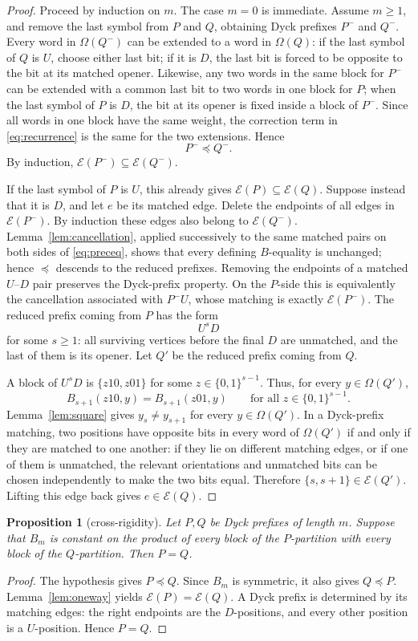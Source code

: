 \documentclass[11pt]{article}
\newtheorem{proposition}[theorem]{Proposition}
\theoremstyle{definition}
\newcommand{\E}{\mathcal E}
\newcommand{\Om}{\Omega}
\newcommand{\bits}{\{0,1\}}
\begin{document}
\begin{proof}
Proceed by induction on $m$.  The case $m=0$ is immediate.  Assume $m\ge1$, and remove the last symbol from $P$ and $Q$, obtaining Dyck prefixes $P^-$ and $Q^-$.  Every word in $\Om(Q^-)$ can be extended to a word in $\Om(Q)$: if the last symbol of $Q$ is $U$, choose either last bit; if it is $D$, the last bit is forced to be opposite to the bit at its matched opener.  Likewise, any two words in the same block for $P^-$ can be extended with a common last bit to two words in one block for $P$; when the last symbol of $P$ is $D$, the bit at its opener is fixed inside a block of $P^-$.  Since all words in one block have the same weight, the correction term in \eqref{eq:recurrence} is the same for the two extensions.  Hence
\[
 P^-\preccurlyeq Q^-.
\]
By induction, $\E(P^-)\subseteq\E(Q^-)$.

If the last symbol of $P$ is $U$, this already gives $\E(P)\subseteq\E(Q)$.  Suppose instead that it is $D$, and let $e$ be its matched edge.  Delete the endpoints of all edges in $\E(P^-)$.  By induction these edges also belong to $\E(Q^-)$.  Lemma~\ref{lem:cancellation}, applied successively to the same matched pairs on both sides of \eqref{eq:preceq}, shows that every defining $B$-equality is unchanged; hence $\preccurlyeq$ descends to the reduced prefixes.  Removing the endpoints of a matched $U$--$D$ pair preserves the Dyck-prefix property.  On the $P$-side this is equivalently the cancellation associated with $P^-U$, whose matching is exactly $\E(P^-)$.  The reduced prefix coming from $P$ has the form
\[
 U^sD
\]
for some $s\ge1$: all surviving vertices before the final $D$ are unmatched, and the last of them is its opener.  Let $Q'$ be the reduced prefix coming from $Q$.

A block of $U^sD$ is $\{z10,z01\}$ for some $z\in\bits^{s-1}$.  Thus, for every $y\in\Om(Q')$,
\[
 B_{s+1}(z10,y)=B_{s+1}(z01,y)
 \qquad\text{for all }z\in\bits^{s-1}.
\]
Lemma~\ref{lem:square} gives $y_s\ne y_{s+1}$ for every $y\in\Om(Q')$.  In a Dyck-prefix matching, two positions have opposite bits in every word of $\Om(Q')$ if and only if they are matched to one another: if they lie on different matching edges, or if one of them is unmatched, the relevant orientations and unmatched bits can be chosen independently to make the two bits equal.  Therefore $\{s,s+1\}\in\E(Q')$.  Lifting this edge back gives $e\in\E(Q)$.
\end{proof}

\begin{proposition}[cross-rigidity]\label{prop:crossrigidity}
Let $P,Q$ be Dyck prefixes of length $m$.  Suppose that $B_m$ is constant on the product of every block of the $P$-partition with every block of the $Q$-partition.  Then $P=Q$.
\end{proposition}
\begin{proof}
The hypothesis gives $P\preccurlyeq Q$.  Since $B_m$ is symmetric, it also gives $Q\preccurlyeq P$.  Lemma~\ref{lem:oneway} yields $\E(P)=\E(Q)$.  A Dyck prefix is determined by its matching edges: the right endpoints are the $D$-positions, and every other position is a $U$-position.  Hence $P=Q$.
\end{proof}
\end{document}
